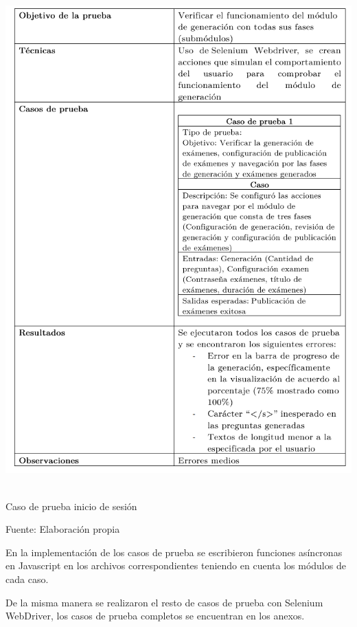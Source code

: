 \documentclass[../Main.tex]{subfiles}
\begin{document}
    \begin{table}[H]
	\begin{Center}
		\includegraphics[width=5.7in,height=7.5in]{Chapters/06ChapterPruebas/images/caso_prueba_react_completo.png}
	    \caption{Caso de prueba inicio de sesión}
	    Fuente: Elaboración propia
        \label{tab:table1}
	\end{Center}
    \end{table}
    
    \newpage
    \begin{justify}
    En la implementación de los casos de prueba se escribieron funciones asíncronas en Javascript en los archivos correspondientes teniendo en cuenta los módulos de cada caso.
    \end{justify}
    
    \begin{justify}
    De la misma manera se realizaron el resto de casos de prueba con Selenium WebDriver, los casos de prueba completos se encuentran en los anexos.
    \end{justify}
\end{document}
